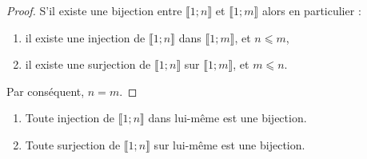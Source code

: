 \begin{proof}
S'il existe une bijection entre \(⟦1;𝑛⟧\) et \(⟦1;𝑚⟧\) alors en particulier :
\begin{enumerate}
\item il existe une injection de \(⟦1;𝑛⟧\) dans \(⟦1;𝑚⟧\), et \(𝑛⩽𝑚\),
\item il existe une surjection de \(⟦1;𝑛⟧\) sur \(⟦1;𝑚⟧\), et \(𝑚⩽𝑛\).
\end{enumerate}
Par conséquent, \(𝑛=𝑚\).
\end{proof}
%
\begin{theorem}
\par\noindent
\begin{enumerate}
\item Toute injection de \(⟦1;𝑛⟧\) dans lui-même est une bijection.
\item Toute surjection de \(⟦1;𝑛⟧\) sur lui-même est une bijection.
\end{enumerate}
\end{theorem}
%
